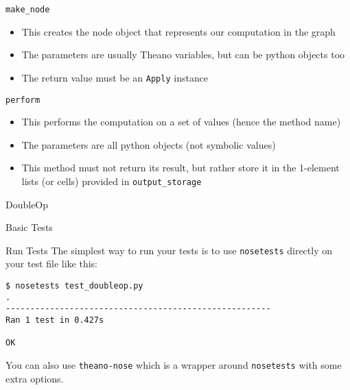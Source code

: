 \documentclass[utf8x]{beamer}
\newcommand{\code}[1]{\lstinline[emph={[2]}]|#1|}
\begin{document}
\begin{frame}{\code{make_node}}

\begin{itemize}
\item This creates the node object that represents our computation in the graph
\item The parameters are usually Theano variables, but can be python objects too
\item The return value must be an \code{Apply} instance
\end{itemize}
\end{frame}

\begin{frame}{\code{perform}}

\begin{itemize}
\item This performs the computation on a set of values (hence the method name)
\item The parameters are all python objects (not symbolic values)
\item This method must not return its result, but rather store it in the 1-element lists (or cells) provided in \code{output_storage}
\end{itemize}
\end{frame}

\begin{frame}{DoubleOp}

\end{frame}


\begin{frame}{Basic Tests}

\end{frame}

\begin{frame}[fragile]{Run Tests}
The simplest way to run your tests is to use \texttt{nosetests} directly on your test file like this:

\begin{lstlisting}[language={},backgroundcolor=\color{white},frame={}]
$ nosetests test_doubleop.py
.
------------------------------------------------------
Ran 1 test in 0.427s

OK
\end{lstlisting}

You can also use \texttt{theano-nose} which is a wrapper around \texttt{nosetests} with some extra options.

\end{frame}
\end{document}
